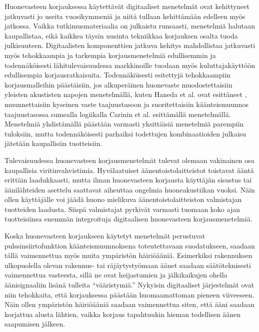 \documentclass[finnish,12pt]{article}
\begin{document}
Huonevasteen korjauksessa käytettävät digitaaliset menetelmät ovat kehittyneet jatkuvasti jo useita vuosikymmeniä ja niitä tullaan kehittämään edelleen myös jatkossa. Vaikka tutkimusmateriaalia on julkaistu runsaasti, menetelmiä halutaan kaupallistaa, eikä kaikkea täysin uusinta tekniikkaa korjauksen osalta tuoda julkisuuteen. Digitaalisten komponenttien jatkuva kehitys mahdollistaa jatkuvasti myös tehokkaampia ja tarkempia korjausmenetelmiä edullisemmin ja todennäköisesti lähitulevaisuudessa markkinoille tuodaan myös kuluttajakäyttöön edullisempia korjausratkaisuita. Todennäköisesti esitettyjä tehokkaampiin korjausmalleihin päästäisiin, jos alkuperäinen huonevaste muodostettaisiin yleisten akustisten napojen menetelmällä, kuten Haneda et al. ovat esittäneet \cite{YHaneda1994, YHaneda1997}, muunnettaisiin kyseinen vaste taajuustasoon ja suoritettaisiin käänteismuunnos taajuustasossa sumealla logiikalla Carinin et al. \cite{ACarini2012} esittämällä menetelmällä. Menetelmiä yhdistämällä päästään varmasti yksittäisiä menetelmiä parempiin tuloksiin, mutta todennäköisesti parhaiksi todettujen kombinaatioiden julkaisu jätetään kaupallisiin tuotteisiin.

Tulevaisuudessa huonevasteen korjausmenetelmät tulevat olemaan vakinainen osa kaupallisia viritinvahvistimia. Hyvälaatuiset äänentoistolaitteistot toistavat ääntä erittäin laadukkaasti, mutta ilman huonevasteen korjausta käyttäjän sisustus tai äänilähteiden asettelu saattavat aiheuttaa ongelmia huoneakustiikan vuoksi. Näin ollen käyttäjälle voi jäädä huono mielikuva äänentoistolaitteiston valmistajan tuotteiden laadusta. Siispä valmistajat pyrkivät varmasti tuomaan koko ajan tuotteisiinsa enemmän integroituja digitaalisen huonevasteen korjausmenetelmiä.

Koska huonevasteen korjaukseen käytetyt menetelmät perustuvat pulssinsiirtofunktion käänteismuunnoksena toteutettavaan suodatukseen, saadaan tällä vaimennettua myös muita ympäristön häiriöääniä. Esimerkiksi rakennuksen ulkopuolella olevan rakennus- tai räjäytystyömaan äänet saadaan säätöteknisesti vaimennettua vasteesta, sillä ne ovat heijastumien ja jälkikaikujen ohella äänisignaaliin lisänä tulleita ``vääristymiä.'' Nykyisin digitaaliset järjestelmät ovat niin tehokkaita, että korjauksessa päästään huomaamattoman pieneen viiveeseen. Näin ollen ympäristön häiriöääniä saadaan vaimennettua siten, että ääni saadaan korjattua alusta lähtien, vaikka korjaus tapahtuukin hieman todellisen äänen saapumisen jälkeen.

\clearpage
\end{document}
